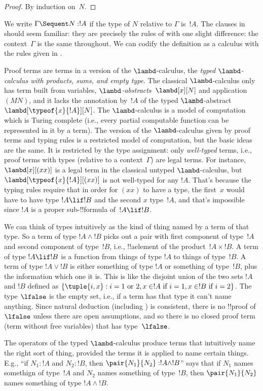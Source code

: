 \documentclass[../../../include/open-logic-section]{subfiles}
\begin{document}
\begin{proof}
  By induction on~$N$.
\end{proof}

We write $\Gamma \Sequent N : !A$ if the type of $N$ relative to
$\Gamma$ is~$!A$. The clauses in  should seem familiar:
they are precisely the rules of  with one slight difference:
the context~$\Gamma$ is the same throughout. We can codify the
definition as a calculus  with the rules given in .



Proof terms are terms in a version of the $\lambd$-calculus, the
\emph{typed $\lambd$-calculus with products, sums, and empty type}. The
classical $\lambd$-calculus only has term built from variables,
\emph{$\lambd$-abstracts}~$\lambd[x][N]$ and application $(MN)$, and
it lacks the annotation by~$!A$ of the typed $\lambd$-abstract
$\lambd[\typeof{x}{!A}][N]$. The $\lambd$-calculus is a model of
computation which is Turing complete (i.e., every partial computable
function can be represented in it by a term). The version of the
$\lambd$-calculus given by proof terms and typing rules is a
restricted model of computation, but the basic ideas are the same. It
is restricted by the type assignment: only \emph{well-typed} terms,
i.e., proof terms with types (relative to a context~$\Gamma$) are
legal terms. For instance, $\lambd[x][(xx)]$ is a legal term in the
classical untyped $\lambd$-calculus, but
$\lambd[\typeof{x}{!A}][(xx)]$ is not well-typed for any $!A$. That's
because the typing rules require that in order for $(xx)$ to have a
type, the first~$x$ would have to have type $!A \lif !B$ and the
second $x$ type~$!A$, and that's impossible since $!A$ is a proper
sub-!!{formula} of~$!A \lif !B$.

We can think of types intuitively as the kind of thing named by a term
of that type. So a term of type $!A \land !B$ picks out a pair with
first component of type~$!A$ and second component of type~$!B$, i.e.,
!!a{element} of the product~$!A \times !B$. A term of type $!A \lif !B$
is a function from things of type $!A$ to things of type~$!B$. A term
of type $!A \lor !B$ is either something of type $!A$ or something of
type~$!B$, plus the information which one it is. This is like the
disjoint union of the two sets $!A$ and $!B$ defined as $\{\tuple{i,x}
: i = 1 \text{ or } 2, x \in !A \text{ if } i = 1, x \in !B \text{ if
} i=2\}$. The type $\lfalse$ is the empty set, i.e., if a term has
that type it can't name anything. Since natural deduction (including
) is consistent, there is no !!{proof} of~$\lfalse$ unless
there are open assumptions, and so there is no closed proof term (term
without free variables) that has type~$\lfalse$.

The operators of the typed $\lambd$-calculus produce terms that
intuitively name the right sort of thing, provided the terms it is
applied to name certain things. E.g., ``if $N_1 : !A$ and $N_2 : !B$,
then $\pair{N_1}{N_2} : !A \land !B$'' says that if $N_1$ names
somethign of type~$!A$ and $N_2$ names something of type~$!B$, then
$\pair{N_1}{N_2}$ names something of type $!A \land !B$.
\end{document}
